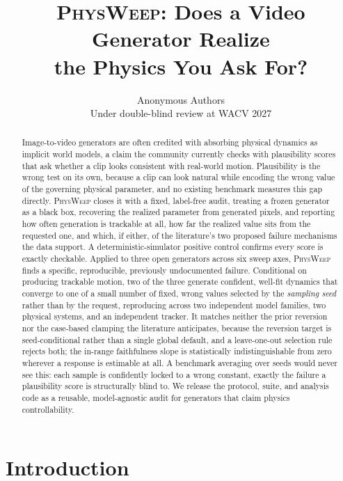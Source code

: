 \documentclass[10pt,twocolumn,letterpaper]{article}
\title{\textbf{\textsc{PhysWeep}: Does a Video Generator Realize\\[2pt]
the Physics You Ask For?}}
\author{Anonymous Authors\\ Under double-blind review at WACV 2027}
\begin{document}
\maketitle

\begin{abstract}
Image-to-video generators are often credited with absorbing physical
dynamics as implicit world models, a claim the community currently checks
with plausibility scores that ask whether a clip looks consistent with
real-world motion. Plausibility is the wrong test on its own, because a
clip can look natural while encoding the wrong value of the governing
physical parameter, and no existing benchmark measures this gap directly.
\textsc{PhysWeep} closes it with a fixed, label-free audit, treating a
frozen generator as a black box, recovering the realized parameter from
generated pixels, and reporting how often generation is trackable at all,
how far the realized value sits from the requested one, and which, if
either, of the literature's two proposed failure mechanisms the data
support. A deterministic-simulator positive control confirms every score
is exactly checkable.
Applied to three open generators across six sweep axes, \textsc{PhysWeep}
finds a specific, reproducible, previously undocumented failure.
Conditional on producing trackable motion, two of the three generate
confident, well-fit dynamics that converge to one of a small number of
fixed, wrong values selected by the \emph{sampling seed} rather than by
the request, reproducing across two independent model families, two
physical systems, and an independent tracker. It matches neither the
prior reversion nor the case-based clamping the literature anticipates,
because the reversion target is seed-conditional rather than a single
global default, and a leave-one-out selection rule rejects both; the
in-range faithfulness slope is statistically indistinguishable from zero
wherever a response is estimable at all. A benchmark averaging over seeds
would never see this: each sample is confidently locked to a wrong
constant, exactly the failure a plausibility score is structurally blind
to. We release the protocol, suite, and analysis code as a reusable,
model-agnostic audit for generators that claim physics controllability.
\end{abstract}

\section{Introduction}
\label{sec:intro}
\end{document}
